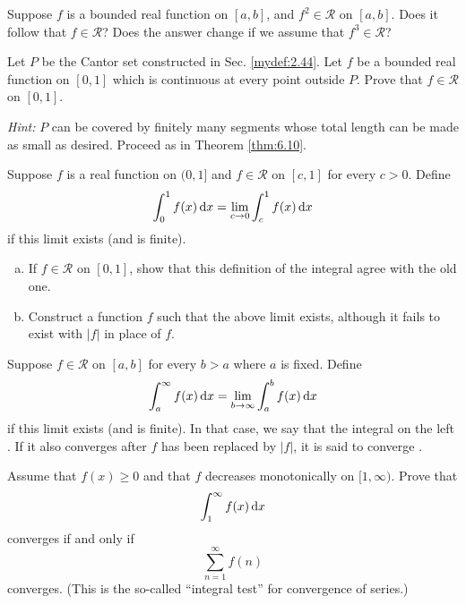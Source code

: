 \begin{myExercise}
    \label{ex:6.5}
    Suppose $f$ is a bounded real function on $[a, b]$, 
    and $f^2 \in \mathscr{R}$ on $[a, b]$. 
    Does it follow that $f \in \mathscr{R}$? 
    Does the answer change if we assume that $f^3 \in \mathscr{R}$?
\end{myExercise}


\begin{myExercise}
    \label{ex:6.6}
    Let $P$ be the Cantor set constructed in Sec. \ref{mydef:2.44}. 
    Let $f$ be a bounded real function on $[0, 1]$ which is continuous at every point outside $P$. 
    Prove that $f \in \mathscr{R}$ on $[0, 1]$.
    
    \emph{Hint:} $P$ can be covered by finitely many segments whose total length can be made as small as desired. 
    Proceed as in Theorem \ref{thm:6.10}.
\end{myExercise}


\begin{myExercise}
    \label{ex:6.7}
    Suppose $f$ is a real function on $(0, 1]$ and $f \in \mathscr{R}$ on $[c, 1]$ for every $c > 0$. 
    Define
    \begin{equation*}
        \int_{0}^{1} f(x) \d x =
        \lim_{c \to 0} \int_{c}^{1} f(x) \d x
    \end{equation*}
    if this limit exists (and is finite).
    \begin{enumerate}[(a)]
        \item If $f \in \mathscr{R}$ on $[0,1]$, show that this definition of the integral agree with the old one.
        \item Construct a function $f$ such that the above limit exists, although it fails to exist with $|f|$ in place of $f$.
    \end{enumerate}
\end{myExercise}


\begin{myExercise}
    \label{ex:6.8}
    Suppose $f \in \mathscr{R}$ on $[a, b]$ for every $b > a$ where $a$ is fixed. 
    Define
    \begin{equation*}
        \int_{a}^{\infty} f(x) \d x = 
        \lim_{b \to \infty} \int_{a}^{b} f(x) \d x
    \end{equation*}
    if this limit exists (and is finite). 
    In that case, we say that the integral on the left . 
    If it also converges after $f$ has been replaced by $|f|$, it is said to converge .

    Assume that $f(x) \geq 0$ and that $f$ decreases monotonically on $[1, \infty)$. 
    Prove that
    \begin{equation*}
        \int_{1}^{\infty} f(x) \d x
    \end{equation*}
    converges if and only if 
    \begin{equation*}
        \sum_{n=1}^{\infty} f(n)
    \end{equation*}
    converges.
    (This is the so-called ``integral test'' for convergence of series.)
\end{myExercise}


